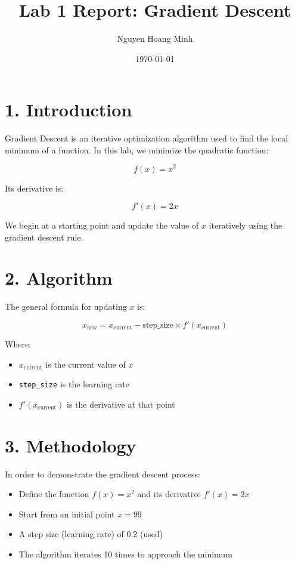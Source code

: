 \documentclass{article}
\title{Lab 1 Report: Gradient Descent}
\author{Nguyen Hoang Minh}
\date{\today}
\begin{document}
\maketitle

\section*{1. Introduction}

Gradient Descent is an iterative optimization algorithm used to find the local minimum of a function.
In this lab, we minimize the quadratic function:

\[
f(x) = x^2
\]

Its derivative is:

\[
f'(x) = 2x
\]

We begin at a starting point and update the value of \( x \) iteratively using the gradient descent rule.

\section*{2. Algorithm}

The general formula for updating \( x \) is:

\[
x_{\text{new}} = x_{\text{current}} - \text{step\_size} \times f'(x_{\text{current}})
\]

Where:
\begin{itemize}
    \item \( x_{\text{current}} \) is the current value of \( x \)
    \item \texttt{step\_size} is the learning rate
    \item \( f'(x_{\text{current}}) \) is the derivative at that point
\end{itemize}

\section*{3. Methodology}

In order to demonstrate the gradient descent process:
\begin{itemize}
    \item Define the function \( f(x) = x^2 \) and its derivative \( f'(x) = 2x \)
    \item Start from an initial point \( x = 99 \)
    \item A step size (learning rate) of 0.2 (used)
    \item The algorithm iterates 10 times to approach the minimum
\end{itemize}
\end{document}

